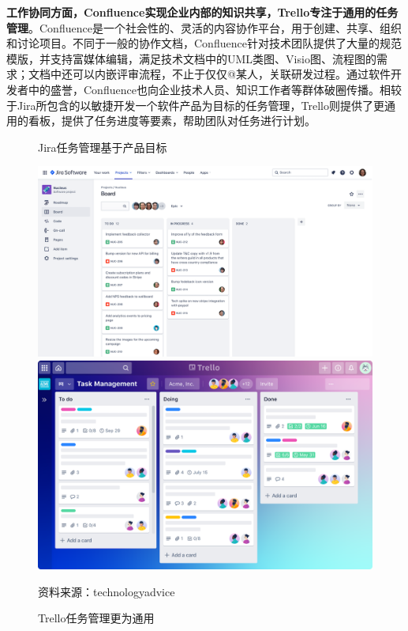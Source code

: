 \textbf{工作协同方面，Confluence实现企业内部的知识共享，Trello专注于通用的任务管理}。Confluence是一个社会性的、灵活的内容协作平台，用于创建、共享、组织和讨论项目。不同于一般的协作文档，Confluence针对技术团队提供了大量的规范模版，并支持富媒体编辑，满足技术文档中的UML类图、Visio图、流程图的需求；文档中还可以内嵌评审流程，不止于仅仅@某人，关联研发过程。通过软件开发者中的盛誉，Confluence也向企业技术人员、知识工作者等群体破圈传播。相较于Jira所包含的以敏捷开发一个软件产品为目标的任务管理，Trello则提供了更通用的看板，提供了任务进度等要素，帮助团队对任务进行计划。
\begin{figure}[H]
    \begin{minipage}{0.48\linewidth}
        \caption{Jira任务管理基于产品目标}
        \includegraphics[width=\linewidth]{img/jira.png}
    \end{minipage}
    \begin{minipage}{0.48\linewidth}
        \caption{Trello任务管理更为通用}
        \includegraphics[width=\linewidth]{img/Trello.png}
    \end{minipage}

    \footnotesize{资料来源：technologyadvice}
\end{figure}

